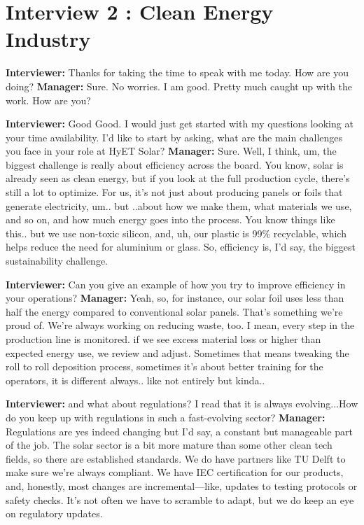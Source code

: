 \section{Interview 2 : Clean Energy Industry}
\textbf{Interviewer:} Thanks for taking the time to speak with me today. How are you doing? \newline
\textbf{Manager:} Sure. No worries. I am good. Pretty much caught up with the work. How are you? \newline

\textbf{Interviewer:} Good Good. I would just get started with my questions looking at your time availability. I'd like to start by asking, what are the main challenges you face in your role at HyET Solar?
\textbf{Manager:} Sure. Well, I think, um, the biggest challenge is really about efficiency across the board. You know, solar is already seen as clean energy, but if you look at the full production cycle, there's still a lot to optimize. For us, it's not just about producing panels or foils that generate electricity, um.. but ..about how we make them, what materials we use, and so on,  and how much energy goes into the process. You know things like this.. but we use non-toxic silicon, and, uh, our plastic is 99\% recyclable, which helps reduce the need for aluminium or glass. So, efficiency is, I'd say, the biggest sustainability challenge. \newline

\textbf{Interviewer:} Can you give an example of how you try to improve efficiency in your operations? \newline
\textbf{Manager:} Yeah, so, for instance, our solar foil uses less than half the energy compared to conventional solar panels. That's something we're proud of. We're always working on reducing waste, too. I mean, every step in the production line is monitored. if we see excess material loss or higher than expected energy use, we review and adjust. Sometimes that means tweaking the roll to roll deposition process, sometimes it's about better training for the operators, it is different always.. like not entirely but kinda.. \newline

\textbf{Interviewer:} and what about regulations? I read that it is always evolving...How do you keep up with regulations in such a fast-evolving sector? \newline
\textbf{Manager:} Regulations are yes indeed changing but I'd say, a constant but manageable part of the job. The solar sector is a bit more mature than some other clean tech fields, so there are established standards. We do have partners like TU Delft to make sure we're always compliant. We have IEC certification for our products, and, honestly, most changes are incremental—like, updates to testing protocols or safety checks. It's not often we have to scramble to adapt, but we do keep an eye on regulatory updates. \newline

